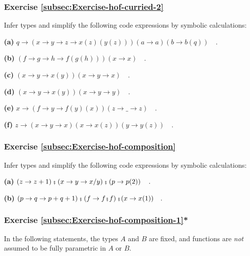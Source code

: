 \subsubsection{Exercise \label{subsec:Exercise-hof-curried-2}\ref{subsec:Exercise-hof-curried-2}}

Infer types and simplify the following code expressions by symbolic
calculations:

\textbf{(a)} $q\rightarrow\left(x\rightarrow y\rightarrow z\rightarrow x(z)(y(z))\right)\left(a\rightarrow a\right)\left(b\rightarrow b(q)\right)\quad.$

\textbf{(b)} $\left(f\rightarrow g\rightarrow h\rightarrow f(g(h))\right)(x\rightarrow x)\quad.$

\textbf{(c)} $\left(x\rightarrow y\rightarrow x(y)\right)\left(x\rightarrow y\rightarrow x\right)\quad.$

\textbf{(d)} $\left(x\rightarrow y\rightarrow x(y)\right)\left(x\rightarrow y\rightarrow y\right)\quad.$

\textbf{(e)} $x\rightarrow\left(f\rightarrow y\rightarrow f(y)(x)\right)\left(z\rightarrow\_\rightarrow z\right)\quad.$

\textbf{(f)} $z\rightarrow\left(x\rightarrow y\rightarrow x\right)\left(x\rightarrow x(z)\right)(y\rightarrow y(z))\quad.$

\subsubsection{Exercise \label{subsec:Exercise-hof-composition}\ref{subsec:Exercise-hof-composition}}

Infer types and simplify the following code expressions by symbolic
calculations:

\textbf{(a)} $\left(z\rightarrow z+1\right)\bef\left(x\rightarrow y\rightarrow x/y\right)\bef\left(p\rightarrow p(2)\right)\quad.$

\textbf{(b)} $\left(p\rightarrow q\rightarrow p+q+1\right)\bef\left(f\rightarrow f\bef f\right)\bef(x\rightarrow x(1))\quad.$

\subsubsection{Exercise \label{subsec:Exercise-hof-composition-1}\ref{subsec:Exercise-hof-composition-1}{*}}

In the following statements, the types $A$ and $B$ are fixed, and
functions are \emph{not} assumed to be fully parametric in $A$ or
$B$.

